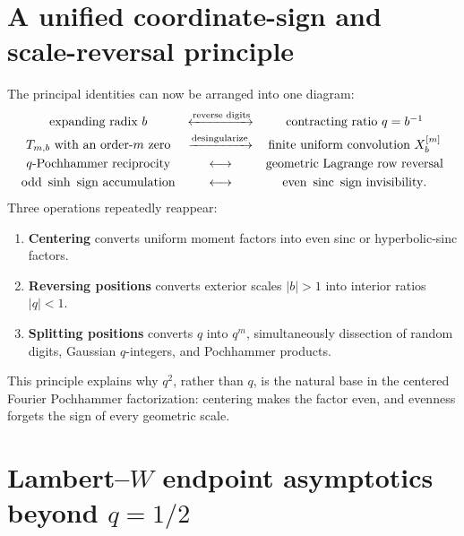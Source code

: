 \documentclass[11pt,oneside]{article}
\theoremstyle{definition}
\theoremstyle{remark}
\newcommand{\sinc}{\operatorname{sinc}}
\begin{document}
\section{A unified coordinate-sign and scale-reversal principle}
The principal identities can now be arranged into one diagram:
\[
\begin{array}{ccc}
\text{expanding radix }b & \xleftrightarrow{\text{reverse digits}} &
\text{contracting ratio }q=b^{-1}\\[0.3em]
T_{m,b}\text{ with an order-}m\text{ zero}
&\xrightarrow{\text{desingularize}}&
\text{finite uniform convolution }X_b^{[m]}\\[0.3em]
q\text{-Pochhammer reciprocity}
&\longleftrightarrow&
\text{geometric Lagrange row reversal}\\[0.3em]
\text{odd }\sinh\text{ sign accumulation}
&\longleftrightarrow&
\text{even }\sinc\text{ sign invisibility}.
\end{array}
\]
Three operations repeatedly reappear:
\begin{enumerate}
\item \textbf{Centering} converts uniform moment factors into even sinc or
  hyperbolic-sinc factors.
\item \textbf{Reversing positions} converts exterior scales \(|b|>1\) into
  interior ratios \(|q|<1\).
\item \textbf{Splitting positions} converts \(q\) into \(q^m\), simultaneously
  dissection of random digits, Gaussian \(q\)-integers, and Pochhammer products.
\end{enumerate}
This principle explains why \(q^2\), rather than \(q\), is the natural base in
the centered Fourier Pochhammer factorization: centering makes the factor even,
and evenness forgets the sign of every geometric scale.

\section{Lambert--\texorpdfstring{\(W\)}{W} endpoint asymptotics beyond \texorpdfstring{\(q=1/2\)}{q=1/2}}
\end{document}

